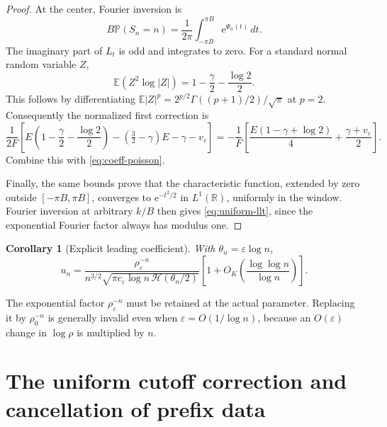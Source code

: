 \documentclass[11pt,a4paper]{article}
\numberwithin{equation}{section}
\newtheorem{corollary}[theorem]{Corollary}
\theoremstyle{definition}
\theoremstyle{remark}
\newcommand{\eps}{\varepsilon}
\newcommand{\E}{\mathbb E}
\newcommand{\Pp}{\mathbb P}
\newcommand{\R}{\mathbb R}
\newcommand{\ee}{\mathrm e}
\newcommand{\hc}{\mathcal H}
\begin{document}
\begin{proof}
At the center, Fourier inversion is
\[
 B\Pp(S_n=n)=\frac1{2\pi}\int_{-\pi B}^{\pi B}\ee^{\Psi_n(t)}\,dt.
\]
The imaginary part of \(L_t\) is odd and integrates to zero. For a standard
normal random variable \(Z\),
\begin{equation}
 \E(Z^2\log|Z|)=1-\frac\gamma2-\frac{\log2}{2}.
 \label{eq:Gaussian-log-moment}
\end{equation}
This follows by differentiating
\(\E|Z|^p=2^{p/2}\Gamma((p+1)/2)/\sqrt\pi\) at \(p=2\).
Consequently the normalized first correction is
\[
 \frac1{2F}
 \left[E\left(1-\frac\gamma2-\frac{\log2}2\right)
      -(\tfrac32-\gamma)E-\gamma-v_{\eps}\right]
 =-\frac1F\left[\frac{E(1-\gamma+\log2)}4
                 +\frac{\gamma+v_{\eps}}2\right].
\]
Combine this with \eqref{eq:coeff-poisson}.

Finally, the same bounds prove that the characteristic function, extended
by zero outside \([-\pi B,\pi B]\), converges to \(\ee^{-t^2/2}\) in
\(L^1(\R)\), uniformly in the window. Fourier inversion at arbitrary
\(k/B\) then gives \eqref{eq:uniform-llt}, since the exponential Fourier
factor always has modulus one.
\end{proof}

\begin{corollary}[Explicit leading coefficient]
\label{cor:leading-coefficient}
With \(\theta_n=\eps\log n\),
\begin{equation}
 u_n=\frac{\rho_{\eps}^{-n}}
 {n^{3/2}\sqrt{\pi c_{\eps}\log n\,\hc(\theta_n/2)}}
 \left[1+O_K\left(\frac{\log\log n}{\log n}\right)\right].
 \label{eq:leading-coefficient}
\end{equation}
\end{corollary}
The exponential factor \(\rho_{\eps}^{-n}\) must be retained at the actual
parameter. Replacing it by \(\rho_0^{-n}\) is generally invalid even when
\(\eps=O(1/\log n)\), because an \(O(\eps)\) change in \(\log\rho\) is
multiplied by \(n\).

\section{The uniform cutoff correction and cancellation of prefix data}
\label{sec:cutoff}
\end{document}
